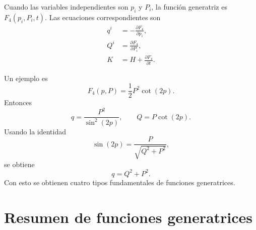 \documentclass[../apunte_mecanica_clasica.tex]{subfiles}
\begin{document}
Cuando las variables independientes son \(p_i\) y \(P_i\), la función generatriz es \(F_4(p_i,P_i,t)\). Las ecuaciones correspondientes son
\begin{subequations}
\label{eq:tc-F4-ecuaciones}
\begin{align}
    q^i&=-\frac{\partial F_4}{\partial p_i},
    \label{eq:tc-F4-q}\\
    Q^i&=\frac{\partial F_4}{\partial P_i},
    \label{eq:tc-F4-Q}\\
    K&=H+\frac{\partial F_4}{\partial t}.
    \label{eq:tc-F4-K}
\end{align}
\end{subequations}

Un ejemplo es
\begin{equation}
    F_4(p,P)=\frac{1}{2}P^2\cot(2p).
    \label{eq:tc-F4-ejemplo}
\end{equation}
Entonces
\begin{equation}
    q=\frac{P^2}{\sin^2(2p)},
    \qquad
    Q=P\cot(2p).
    \label{eq:tc-F4-ejemplo-transformacion}
\end{equation}
Usando la identidad
\begin{equation}
    \sin(2p)=\frac{P}{\sqrt{Q^2+P^2}},
    \label{eq:tc-sin-ejemplo-F4}
\end{equation}
se obtiene
\begin{equation}
    q=Q^2+P^2.
    \label{eq:tc-F4-q-final}
\end{equation}
Con esto se obtienen cuatro tipos fundamentales de funciones generatrices.

\section{Resumen de funciones generatrices}
\label{sec:tc-resumen-generatrices}
\end{document}
